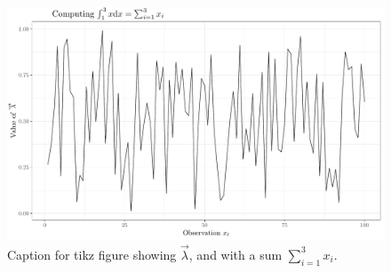 \documentclass[
]{book}
\begin{document}
\begin{figure}[H]

{\centering \includegraphics[width=0.9\linewidth]{Rcode/tikzfig} 

}

\caption{Caption for tikz figure showing $\overrightarrow{\lambda}$, and with a sum $\sum_{i=1}^{3} x_i$.}\label{fig:unnamed-chunk-1}
\end{figure}

\backmatter
  
\end{document}
